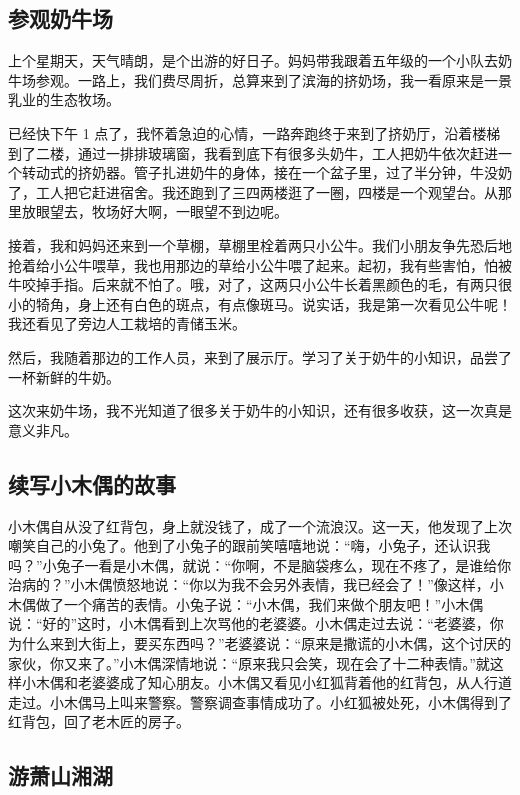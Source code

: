 \documentclass[UTF8,a4paper,titlepage,twoside,10.5pt]{article}
\begin{document}
\subsection{参观奶牛场}
\label{sec:org08f499b}

上个星期天，天气晴朗，是个出游的好日子。妈妈带我跟着五年级的一个小队去奶牛场参观。一路上，我们费尽周折，总算来到了滨海的挤奶场，我一看原来是一景乳业的生态牧场。

已经快下午 1 点了，我怀着急迫的心情，一路奔跑终于来到了挤奶厅，沿着楼梯到了二楼，通过一排排玻璃窗，我看到底下有很多头奶牛，工人把奶牛依次赶进一个转动式的挤奶器。管子扎进奶牛的身体，接在一个盆子里，过了半分钟，牛没奶了，工人把它赶进宿舍。我还跑到了三四两楼逛了一圈，四楼是一个观望台。从那里放眼望去，牧场好大啊，一眼望不到边呢。

接着，我和妈妈还来到一个草棚，草棚里栓着两只小公牛。我们小朋友争先恐后地抢着给小公牛喂草，我也用那边的草给小公牛喂了起来。起初，我有些害怕，怕被牛咬掉手指。后来就不怕了。哦，对了，这两只小公牛长着黑颜色的毛，有两只很小的犄角，身上还有白色的斑点，有点像斑马。说实话，我是第一次看见公牛呢！我还看见了旁边人工栽培的青储玉米。

然后，我随着那边的工作人员，来到了展示厅。学习了关于奶牛的小知识，品尝了一杯新鲜的牛奶。

这次来奶牛场，我不光知道了很多关于奶牛的小知识，还有很多收获，这一次真是意义非凡。

\subsection{续写小木偶的故事}
\label{sec:org7b7f69a}

小木偶自从没了红背包，身上就没钱了，成了一个流浪汉。这一天，他发现了上次嘲笑自己的小兔了。他到了小兔子的跟前笑嘻嘻地说：“嗨，小兔子，还认识我吗？”小兔子一看是小木偶，就说：“你啊，不是脑袋疼么，现在不疼了，是谁给你治病的？”小木偶愤怒地说：“你以为我不会另外表情，我已经会了！”像这样，小木偶做了一个痛苦的表情。小兔子说：“小木偶，我们来做个朋友吧！”小木偶说：“好的”这时，小木偶看到上次骂他的老婆婆。小木偶走过去说：“老婆婆，你为什么来到大街上，要买东西吗？”老婆婆说：“原来是撒谎的小木偶，这个讨厌的家伙，你又来了。”小木偶深情地说：“原来我只会笑，现在会了十二种表情。”就这样小木偶和老婆婆成了知心朋友。小木偶又看见小红狐背着他的红背包，从人行道走过。小木偶马上叫来警察。警察调查事情成功了。小红狐被处死，小木偶得到了红背包，回了老木匠的房子。

\subsection{游萧山湘湖}
\label{sec:org6ccdaca}
\end{document}
